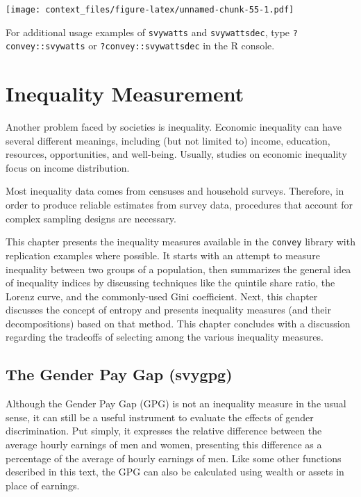 \documentclass[
]{book}
\begin{document}
\texttt{[image: context\_files/figure-latex/unnamed-chunk-55-1.pdf]}

For additional usage examples of \texttt{svywatts} and \texttt{svywattsdec}, type \texttt{?convey::svywatts} or \texttt{?convey::svywattsdec} in the R console.

\hypertarget{inequality}{%
\chapter{Inequality Measurement}\label{inequality}}

Another problem faced by societies is inequality. Economic inequality can have several different meanings, including (but not limited to) income, education, resources, opportunities, and well-being. Usually, studies on economic inequality focus on income distribution.

Most inequality data comes from censuses and household surveys. Therefore, in order to produce reliable estimates from survey data, procedures that account for complex sampling designs are necessary.

This chapter presents the inequality measures available in the \texttt{convey} library with replication examples where possible. It starts with an attempt to measure inequality between two groups of a population, then summarizes the general idea of inequality indices by discussing techniques like the quintile share ratio, the Lorenz curve, and the commonly-used Gini coefficient. Next, this chapter discusses the concept of entropy and presents inequality measures (and their decompositions) based on that method. This chapter concludes with a discussion regarding the tradeoffs of selecting among the various inequality measures.

\hypertarget{the-gender-pay-gap-svygpg}{%
\section{The Gender Pay Gap (svygpg)}\label{the-gender-pay-gap-svygpg}}

Although the Gender Pay Gap (GPG) is not an inequality measure in the usual sense, it can still be a useful instrument to evaluate the effects of gender discrimination. Put simply, it expresses the relative difference between the average hourly earnings of men and women, presenting this difference as a percentage of the average of hourly earnings of men. Like some other functions described in this text, the GPG can also be calculated using wealth or assets in place of earnings.
\end{document}

